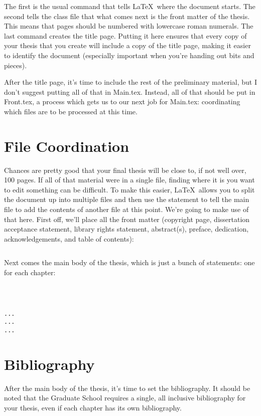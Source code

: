 The first is the usual command that tells \LaTeX\ where the document starts.  The second tells the class file that what comes next is the front matter of the thesis.  This means that pages should be numbered with lowercase roman numerals.  The last command creates the title page.  Putting it here ensures that every copy of your thesis that you create will include a copy of the title page, making it easier to identify the document (especially important when you're handing out bits and pieces).

After the title page, it's time to include the rest of the preliminary material, but I don't suggest putting all of that in Main.tex.  Instead, all of that should be put in Front.tex, a process which gets us to our next job for Main.tex: coordinating which files are to be processed at this time.

\section{File Coordination}
Chances are pretty good that your final thesis will be close to, if not well over, 100 pages.  If all of that material were in a single file, finding where it is you want to edit something can be difficult.  To make this easier, \LaTeX\ allows you to split the document up into multiple files and then use the \verb== statement to tell the main file to add the contents of another file at this point.  We're going to make use of that here.  First off, we'll place all the front matter (copyright page, dissertation acceptance statement, library rights statement, abstract(s), preface, dedication, acknowledgements, and table of contents):

\begin{verbatim}

\end{verbatim}

Next comes the main body of the thesis, which is just a bunch of \verb== statements: one for each chapter:

\begin{verbatim}



...
...
...
\end{verbatim}

\section{Bibliography}\label{bib}
After the main body of the thesis, it's time to set the bibliography.  It should be noted that the Graduate School requires a single, all inclusive bibliography for your thesis, even if each chapter has its own bibliography.

